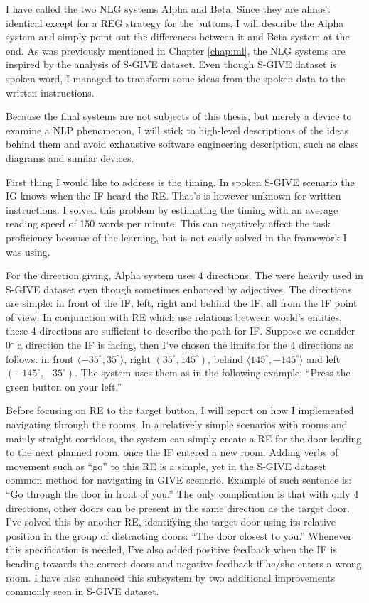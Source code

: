 I have called the two NLG systems Alpha and Beta. Since they are almost identical except for a REG strategy for the buttons, I will describe the Alpha system and simply point out the differences between it and Beta system at the end. As was previously mentioned in Chapter \ref{chap:ml}, the NLG systems are inspired by the analysis of S-GIVE dataset. Even though S-GIVE dataset is spoken word, I managed to transform some ideas from the spoken data to the written instructions.

Because the final systems are not subjects of this thesis, but merely a device to examine a NLP phenomenon, I will stick to high-level descriptions of the ideas behind them and avoid exhaustive software engineering description, such as class diagrams and similar devices.

First thing I would like to address is the timing. In spoken S-GIVE scenario the IG knows when the IF heard the RE. That's is however unknown for written instructions. I solved this problem by estimating the timing with an average reading speed of 150 words per minute. This can negatively affect the task proficiency because of the learning, but is not easily solved in the framework I was using.

For the direction giving, Alpha system uses 4 directions. The were heavily used in S-GIVE dataset even though sometimes enhanced by adjectives. The directions are simple: in front of the IF, left, right and behind the IF; all from the IF point of view. In conjunction with RE which use relations between world's entities, these 4 directions are sufficient to describe the path for IF. Suppose we consider $0^{\circ}$ a direction the IF is facing, then I've chosen the limits for the 4 directions as follows: in front $\langle-35^{\circ},35^{\circ}\rangle$, right $(35^{\circ},145^{\circ})$, behind $\langle145^{\circ},-145^{\circ}\rangle$ and left $(-145^{\circ},-35^{\circ})$. The system uses them as in the following example: ``Press the green button on your left.''

Before focusing on RE to the target button, I will report on how I implemented navigating through the rooms. In a relatively simple scenarios with rooms and mainly straight corridors, the system can simply create a RE for the door leading to the next planned room, once the IF entered a new room. Adding verbs of movement such as ``go'' to this RE is a simple, yet in the S-GIVE dataset common method for navigating in GIVE scenario. Example of such sentence is: ``Go through the door in front of you.'' The only complication is that with only 4 directions, other doors can be present in the same direction as the target door. I've solved this by another RE, identifying the target door using its relative position in the group of distracting doors: ``The door closest to you.'' Whenever this specification is needed, I've also added positive feedback when the IF is heading towards the correct doors and negative feedback if he/she enters a wrong room. I have also enhanced this subsystem by two additional improvements commonly seen in S-GIVE dataset.

